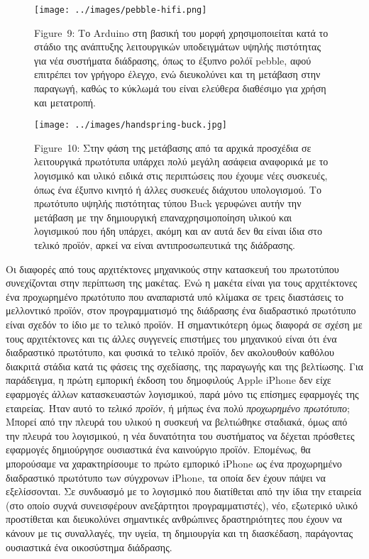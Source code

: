 \documentclass[
]{article}
\begin{document}
\leavevmode{}%
\begin{figure}
\hypertarget{fig:pebble-hifi}{%
\centering
\texttt{[image: ../images/pebble-hifi.png]}
\caption{Figure~9: Το Arduino στη βασική του μορφή χρησιμοποιείται κατά
το στάδιο της ανάπτυξης λειτουργικών υποδειγμάτων υψηλής πιστότητας για
νέα συστήματα διάδρασης, όπως το έξυπνο ρολόϊ pebble, αφού επιτρέπει τον
γρήγορο έλεγχο, ενώ διευκολύνει και τη μετάβαση στην παραγωγή, καθώς το
κύκλωμά του είναι ελεύθερα διαθέσιμο για χρήση και
μετατροπή.}\label{fig:pebble-hifi}
}
\end{figure}

\leavevmode{}%
\begin{figure}
\hypertarget{fig:handspring-buck}{%
\centering
\texttt{[image: ../images/handspring-buck.jpg]}
\caption{Figure~10: Στην φάση της μετάβασης από τα αρχικά προσχέδια σε
λειτουργικά πρωτότυπα υπάρχει πολύ μεγάλη ασάφεια αναφορικά με το
λογισμικό και υλικό ειδικά στις περιπτώσεις που έχουμε νέες συσκευές,
όπως ένα έξυπνο κινητό ή άλλες συσκευές διάχυτου υπολογισμού. Το
πρωτότυπο υψηλής πιστότητας τύπου Buck γερυφώνει αυτήν την μετάβαση με
την δημιουργική επαναχρησιμοποίηση υλικού και λογισμικού που ήδη
υπάρχει, ακόμη και αν αυτά δεν θα είναι ίδια στο τελικό προϊόν, αρκεί να
είναι αντιπροσωπευτικά της διάδρασης.}\label{fig:handspring-buck}
}
\end{figure}

Οι διαφορές από τους αρχιτέκτονες μηχανικούς στην κατασκευή του
πρωτοτύπου συνεχίζονται στην περίπτωση της μακέτας. Ενώ η μακέτα είναι
για τους αρχιτέκτονες ένα προχωρημένο πρωτότυπο που αναπαριστά υπό
κλίμακα σε τρεις διαστάσεις το μελλοντικό προϊόν, στον προγραμματισμό
της διάδρασης ένα διαδραστικό πρωτότυπο είναι σχεδόν το ίδιο με το
τελικό προϊόν. Η σημαντικότερη όμως διαφορά σε σχέση με τους
αρχιτέκτονες και τις άλλες συγγενείς επιστήμες του μηχανικού είναι ότι
ένα διαδραστικό πρωτότυπο, και φυσικά το τελικό προϊόν, δεν ακολουθούν
καθόλου διακριτά στάδια κατά τις φάσεις της σχεδίασης, της παραγωγής και
της βελτίωσης. Για παράδειγμα, η πρώτη εμπορική έκδοση του δημοφιλούς
Apple iPhone δεν είχε εφαρμογές άλλων κατασκευαστών λογισμικού, παρά
μόνο τις επίσημες εφαρμογές της εταιρείας. Ήταν αυτό το \emph{τελικό
προϊόν}, ή μήπως ένα πολύ \emph{προχωρημένο πρωτότυπο}; Μπορεί από την
πλευρά του υλικού η συσκευή να βελτιώθηκε σταδιακά, όμως από την πλευρά
του λογισμικού, η νέα δυνατότητα του συστήματος να δέχεται πρόσθετες
εφαρμογές δημιούργησε ουσιαστικά ένα καινούργιο προϊόν. Επομένως, θα
μπορούσαμε να χαρακτηρίσουμε το πρώτο εμπορικό iPhone ως ένα προχωρημένο
διαδραστικό πρωτότυπο των σύγχρονων iPhone, τα οποία δεν έχουν πάψει να
εξελίσσονται. Σε συνδυασμό με το λογισμικό που διατίθεται από την ίδια
την εταιρεία (στο οποίο συχνά συνεισφέρουν ανεξάρτητοι προγραμματιστές),
νέο, εξωτερικό υλικό προστίθεται και διευκολύνει σημαντικές ανθρώπινες
δραστηριότητες που έχουν να κάνουν με τις συναλλαγές, την υγεία, τη
δημιουργία και τη διασκέδαση, παράγοντας ουσιαστικά ένα οικοσύστημα
διάδρασης.
\end{document}
